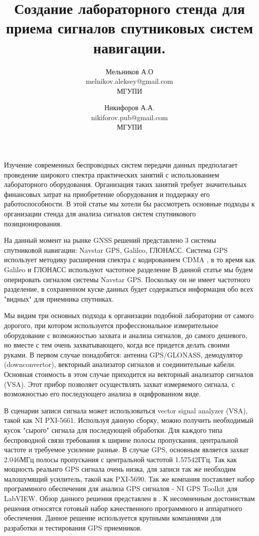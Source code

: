 \documentclass[a4paper,12pt]{article}
\numberwithin{table}{section}
\begin{document}
\title{Создание лабораторного стенда для приема сигналов спутниковых систем навигации.}
\author{Мельников А.О\\ melnikov.aleksey@gmail.com\\ МГУПИ \and Никифоров А.А.\\nikiforov.pub@gmail.com\\ МГУПИ}

\maketitle

Изучение современных беспроводных систем передачи данных предполагает проведение широкого спектра практических занятий с использованием лабораторного
оборудования.
Организация таких занятий требует значительных финансовых затрат на приобретение оборудования и поддержку его работоспособности. В этой статье мы хотели бы
рассмотреть основные подходы к организации стенда для анализа сигналов систем спутникового позиционирования.

На данный момент на рынке GNSS решений представлено 3 системы спутниковой навигации: Navstar GPS, Galileo, ГЛОНАСС. Система GPS использует методику
расширения спектра с кодированием CDMA \cite{gpsuserequipment}, в то время как Galileo и ГЛОНАСС используют частотное разделение \cite{galileo}
В данной статье мы будем оперировать
сигналом системы Navstar GPS. Поскольку он не имеет частотного разделение, в сохраненном куске данных будет содержаться информация обо всех "видных"
для приемника спутниках.
 
Мы видим три основных подхода к организации подобной лаборатории от самого дорогого, при котором используется профессиональное измерительное
оборудование с возможностью
захвата и анализа сигналов, до самого дешевого, но вместе с тем очень захватывающего, когда все придется делать своими руками.
В первом случае понадобятся: антенна GPS/GLONASS, демодулятор (downconvertor),
векторный анализатор сигналов и соединительные кабели. Основная стоимость в этом случае приходится на векторный анализатор сигналов (VSA).
Этот прибор позволяет осуществлять захват измеряемого сигнала, с возможностью его последующего анализа в оцифрованном виде.

В сценарии записи сигнала может использоваться vector signal analyzer (VSA), такой как NI PXI-5661.
Используя данную сборку, можно получить необходимый кусок "сырого" сигнала для последующей обработки.
Для каждого типа беспроводной связи требования к ширине полосы пропускания, центральной частоте и требуемое усиление разные. В
случае GPS, основным является захват 2.046МГц полосы пропускания с центральной частотой 1.57542ГГц.
Так как мощность реальнго GPS сигнала очень низка, для записи так же необходим малошумящий усилитель, такой как PXI-5690.
Так же компания поставляет набор программного обеспечения для анализа  GPS сигналов - NI GPS Toolkit для LabVIEW.
Обзор данного решения представлен в \cite{ni-vsa}.
К несомненным достоинствам решения относятся готовый набор качественного программного и аппаратного обеспечения.
Данное решение используется крупными компаниями для разработки и тестирования GPS приемников.
 
\end{document}
